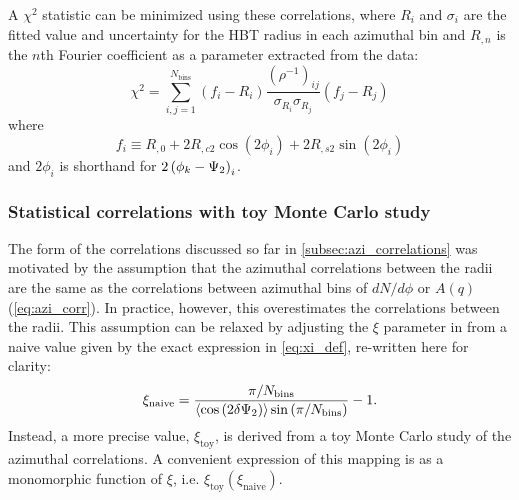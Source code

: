 A $\chi^2$ statistic can be minimized using these correlations, where $R_i$ and $\sigma_{i}$ are the fitted value and uncertainty for the HBT radius in each azimuthal bin and $R_{,n}$ is the $n$th Fourier coefficient as a parameter extracted from the data:
\begin{equation} \label{eq:chi_sq_mod}
\chi^2 = \sum_{i,j=1}^{N_\textrm{bins}} \left( f_i - R_i \right) \frac{(\rho^{-1})_{ij}}{\sigma_{R_i} \sigma_{R_j}} \left( f_j - R_j \right)
\end{equation}
where
\[f_i \equiv R_{,0} + 2R_{,c2}\cos(2\phi_i) + 2R_{,s2}\sin(2\phi_i)\]
and $2\phi_i$ is shorthand for $2\left(\phi_{k}-\Psi_{2}\right)_i$.

\subsubsection{Statistical correlations with toy Monte Carlo study}

The form of the correlations discussed so far in \cref{subsec:azi_correlations} was motivated by the assumption that the azimuthal correlations between the radii are the same as the correlations between azimuthal bins of $dN/d\phi$ or $A(q)$ (\cref{eq:azi_corr}).
In practice, however, this overestimates the correlations between the radii.
This assumption can be relaxed by adjusting the $\xi$ parameter in  from a naive value given by the exact expression in \cref{eq:xi_def}, re-written here for clarity:
\[ \xi_\textrm{naive} = \frac{\pi/N_\textrm{bins}}{\langle \cos\left(2\delta\Psi_{2}\right) \rangle \sin\left(\pi/N_\textrm{bins}\right)} - 1 .\]
Instead, a more precise value, $\xi_\textrm{toy}$, is derived from a toy Monte Carlo study of the azimuthal correlations.
A convenient expression of this mapping is as a monomorphic function of $\xi$, i.e. $\xi_\textrm{toy}(\xi_\textrm{naive})$.

